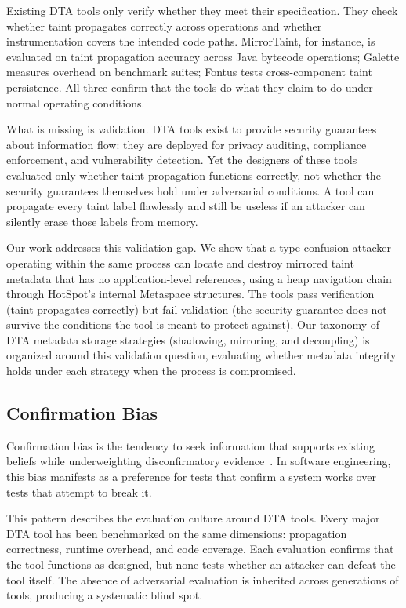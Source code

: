 \documentclass[a4paper,11pt]{article}
\theoremstyle{plain}
\begin{document}
Existing DTA tools only verify whether they meet their specification. They check whether taint propagates correctly across operations and whether instrumentation covers the intended code paths. MirrorTaint, for instance, is evaluated on taint propagation accuracy across Java bytecode operations; Galette measures overhead on benchmark suites; Fontus tests cross-component taint persistence. All three confirm that the tools do what they claim to do under normal operating conditions.

What is missing is validation. DTA tools exist to provide security guarantees about information flow: they are deployed for privacy auditing, compliance enforcement, and vulnerability detection. Yet the designers of these tools evaluated only whether taint propagation functions correctly, not whether the security guarantees themselves hold under adversarial conditions. A tool can propagate every taint label flawlessly and still be useless if an attacker can silently erase those labels from memory.

Our work addresses this validation gap. We show that a type-confusion attacker operating within the same process can locate and destroy mirrored taint metadata that has no application-level references, using a heap navigation chain through HotSpot's internal Metaspace structures. The tools pass verification (taint propagates correctly) but fail validation (the security guarantee does not survive the conditions the tool is meant to protect against). Our taxonomy of DTA metadata storage strategies (shadowing, mirroring, and decoupling) is organized around this validation question, evaluating whether metadata integrity holds under each strategy when the process is compromised.

\subsection{Confirmation Bias}
Confirmation bias is the tendency to seek information that supports existing beliefs while underweighting disconfirmatory evidence~\cite{feldt2026bse}. In software engineering, this bias manifests as a preference for tests that confirm a system works over tests that attempt to break it.

This pattern describes the evaluation culture around DTA tools. Every major DTA tool has been benchmarked on the same dimensions: propagation correctness, runtime overhead, and code coverage. Each evaluation confirms that the tool functions as designed, but none tests whether an attacker can defeat the tool itself. The absence of adversarial evaluation is inherited across generations of tools, producing a systematic blind spot.
\end{document}
